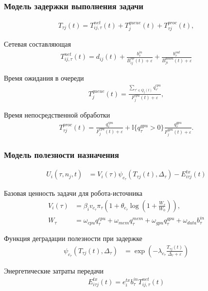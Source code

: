 \begin{frame}
	\frametitle{Модель задержки выполнения задачи}
	\small
	\begin{align*}
		T_{\tau j}(t)=T^{net}_{ij,\tau}(t)+T^{queue}_{j}(t)+T^{proc}_{\tau j}(t),
	\end{align*}

	Сетевая составляющая
	\begin{align*}
		T^{net}_{ij,\tau}(t)=d_{ij}(t)+\frac{b^{in}_{\tau}}{B^{up}_{ij}(t)+\varepsilon}+\frac{b^{out}_{\tau}}{B^{down}_{ji}(t)+\varepsilon}
	\end{align*}

	Время ожидания в очереди
	\begin{align*}
		T^{queue}_{j}(t)=\frac{\sum_{\tau'\in Q_j(t)} q^{cpu}_{\tau'}}{F^{cpu}_{j}(t)+\varepsilon},
	\end{align*}

	Время непосредственной обработки
	\begin{align*}
		T^{proc}_{\tau j}(t)=\frac{q^{cpu}_{\tau}}{F^{cpu}_{j}(t)+\varepsilon}+\mathbb{I}\{q^{gpu}_{\tau}>0\}\frac{q^{gpu}_{\tau}}{F^{gpu}_{j}(t)+\varepsilon}.
	\end{align*}
\end{frame}

\begin{frame}
	\frametitle{Модель полезности назначения}
	\small
	\begin{align*}
		U_i(\tau,n_j,t) &= V_i(\tau)\psi_{c_{\tau}}(T_{\tau j}(t),\Delta_{\tau})-E^{tx}_{i\tau j}(t)
	\end{align*}

	Базовая ценность задачи для робота-источника
	\begin{align*}
		V_i(\tau) &= \beta_i v_{c_{\tau}}\pi_{\tau}\left(1+\theta_{c_{\tau}}\log\left(1+\frac{W_{\tau}}{W_0}\right)\right),\\[-1mm]
		W_{\tau} &= \omega_{cpu}q^{cpu}_{\tau}+\omega_{mem}q^{mem}_{\tau}+\omega_{gpu}q^{gpu}_{\tau}+\omega_{data}b^{in}_{\tau}
	\end{align*}

	Функция деградации полезности при задержке
	\begin{align*}
		\psi_{c_{\tau}}(T_{\tau j}(t),\Delta_{\tau}) &=
		\exp\left(-\lambda_{c_{\tau}}\frac{T_{\tau j}(t)}{\Delta_{\tau}+\varepsilon}\right)
	\end{align*}

	Энергетические затраты передачи
	\begin{align*}
		E^{tx}_{i\tau j}(t)=e^{tx}_i b^{in}_{\tau} T^{net}_{ij,\tau}(t)
	\end{align*}
\end{frame}

